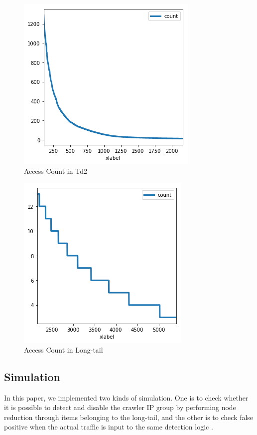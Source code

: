 \begin{figure}[H]
    \centering
    \includegraphics[width=0.7\columnwidth]{figs/figure_03_td2.png}
    \caption{Access Count in Td2}
    \label{fig:my_label}
\end{figure}

\begin{figure}[H]
    \centering
    \includegraphics[width=0.7\columnwidth]{figs/figure_04_td3.png}
    \caption{Access Count in Long-tail}
    \label{fig:my_label}
\end{figure}

\subsection{Simulation}
In this paper, we implemented two kinds of simulation. One is to check whether it is possible to detect and disable the crawler IP group by performing node reduction through items belonging to the long-tail, and the other is to check false positive when the actual traffic is input to the same detection logic .



